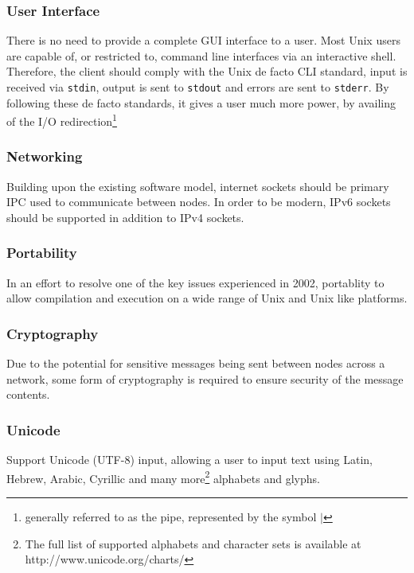 
\subsubsection{User Interface}

There is no need to provide a complete GUI interface to a user. Most
Unix users are capable of, or restricted to, command line interfaces via
an interactive shell. Therefore, the client should comply with the 
Unix de facto CLI standard, input is received via \verb!stdin!, output
is sent to \verb!stdout! and errors are sent to \verb!stderr!. By
following these de facto standards, it gives a user much more power, by
availing of the 
I/O redirection\footnote{generally referred to as the pipe, represented by the symbol $\mid$}

\subsubsection{Networking}

Building upon the existing software model, internet sockets should be 
primary IPC used to communicate between nodes. In order to be modern,
IPv6 sockets should be supported in addition to IPv4 sockets.

\subsubsection{Portability}

In an effort to resolve one of the key issues experienced in 2002, 
portablity to allow compilation and execution on a wide range of Unix
and Unix like platforms.

\subsubsection{Cryptography}

Due to the potential for sensitive messages being sent between nodes
across a network, some form of cryptography is required to ensure 
security of the message contents.

\subsubsection{Unicode}

Support Unicode (UTF-8) input, allowing a user to input text using 
Latin, Hebrew, Arabic, Cyrillic
and many more\footnote{The full list of supported alphabets and character sets is available at http://www.unicode.org/charts/}
alphabets and glyphs. 

